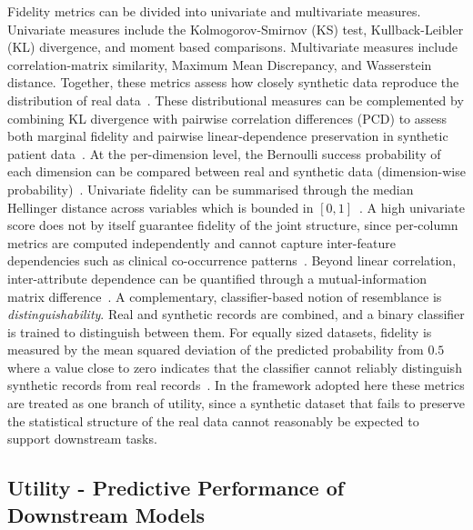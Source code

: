 Fidelity metrics can be divided into univariate and multivariate
measures. Univariate measures include the Kolmogorov-Smirnov (KS) test,
Kullback-Leibler (KL) divergence, and moment based comparisons.
Multivariate measures include correlation-matrix similarity, Maximum Mean
Discrepancy, and Wasserstein distance. Together, these metrics assess how
closely synthetic data reproduce the distribution of real
data~\cite{Murtaza2023}. These distributional measures can be complemented by
combining KL divergence with pairwise correlation differences (PCD) to assess
both marginal fidelity and pairwise linear-dependence preservation in synthetic patient
data~\cite{goncalves2020generation}. At the per-dimension level, the Bernoulli
success probability of each dimension can be compared between real and synthetic
data (dimension-wise probability)~\cite{Choi2017MedGAN}. Univariate
fidelity can be summarised through the median Hellinger distance across
variables which is bounded in $[0,1]$~\cite{emam2021optimizing}. A high
univariate score does not by itself guarantee fidelity of the joint structure,
since per-column metrics are computed independently and cannot capture
inter-feature dependencies such as clinical co-occurrence
patterns~\cite{Murtaza2023}. Beyond linear correlation, 
inter-attribute dependence can be quantified through a
mutual-information matrix difference~\cite{lautrup2025syntheval}. 
A complementary, classifier-based notion
of resemblance is \emph{distinguishability}. Real and synthetic 
records are combined, and a binary classifier is
trained to distinguish between them. For equally sized datasets, fidelity
is measured by the mean squared deviation of the predicted probability
from $0.5$ where a value close to zero indicates that the classifier cannot
reliably distinguish synthetic records from real
records~\cite{emam2021optimizing}. In the framework adopted here these
metrics are treated as one branch of utility, since a synthetic dataset that
fails to preserve the statistical structure of the real data cannot reasonably
be expected to support downstream tasks.

\subsection{Utility - Predictive Performance of Downstream Models}
\label{sec:bg:eval:predictive}

